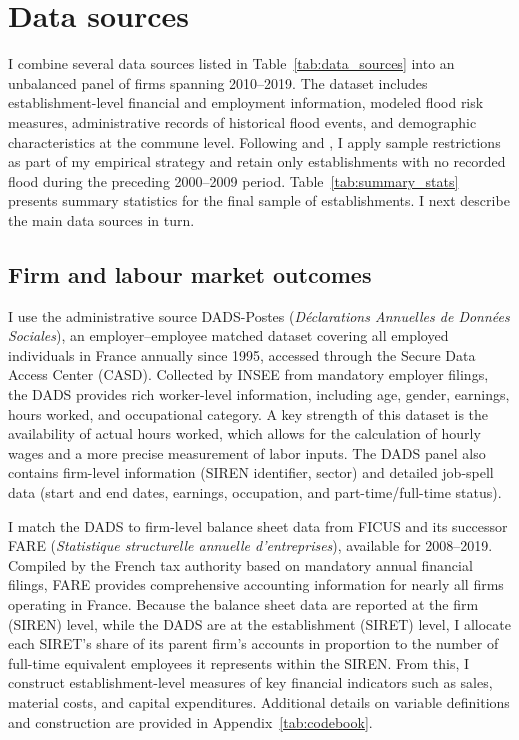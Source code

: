 \chapter{Data sources}
\label{ch: data}

I combine several data sources listed in Table~\ref{tab:data_sources} into an unbalanced panel of firms spanning 2010–2019. The dataset includes establishment-level financial and employment information, modeled flood risk measures, administrative records of historical flood events, and demographic characteristics at the commune level. Following \citet{patel2023floods} and \citet{hussain2024flooding}, I apply sample restrictions as part of my empirical strategy and retain only establishments with no recorded flood during the preceding 2000–2009 period. Table~\ref{tab:summary_stats} presents summary statistics for the final sample of establishments. I next describe the main data sources in turn.






\section{Firm and labour market outcomes}
\label{sec: data_3}
I use the administrative source DADS-Postes (\textit{Déclarations Annuelles de Données Sociales}), an employer–employee matched dataset covering all employed individuals in France annually since 1995, accessed through the Secure Data Access Center (CASD). Collected by INSEE from mandatory employer filings, the DADS provides rich worker-level information, including age, gender, earnings, hours worked, and occupational category. A key strength of this dataset is the availability of actual hours worked, which allows for the calculation of hourly wages and a more precise measurement of labor inputs. The DADS panel also contains firm-level information (SIREN identifier, sector) and detailed job-spell data (start and end dates, earnings, occupation, and part-time/full-time status).

I match the DADS to firm-level balance sheet data from FICUS and its successor FARE (\textit{Statistique structurelle annuelle d’entreprises}), available for 2008–2019. Compiled by the French tax authority based on mandatory annual financial filings, FARE provides comprehensive accounting information for nearly all firms operating in France. Because the balance sheet data are reported at the firm (SIREN) level, while the DADS are at the establishment (SIRET) level, I allocate each SIRET’s share of its parent firm’s accounts in proportion to the number of full-time equivalent employees it represents within the SIREN. From this, I construct establishment-level measures of key financial indicators such as sales, material costs, and capital expenditures. Additional details on variable definitions and construction are provided in Appendix~\ref{tab:codebook}.


